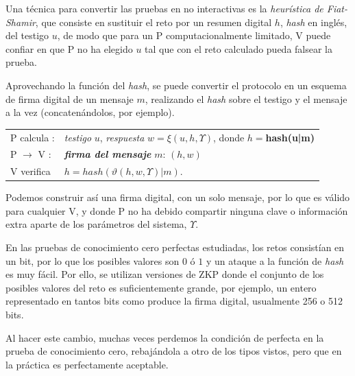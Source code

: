 Una técnica para convertir las pruebas en no interactivas es la \textit{heurística de Fiat-Shamir}, que consiste en sustituir el reto por un resumen digital $h$, \textit{hash} en inglés, del testigo $u$, de modo que para un P computacionalmente limitado, V puede confiar en que P no ha elegido $u$ tal que con el reto calculado pueda falsear la prueba.

Aprovechando la función del \textit{hash}, se puede convertir el protocolo en un esquema de firma digital de un mensaje $m$, realizando el \textit{hash} sobre el testigo y el mensaje a la vez (concatenándolos, por ejemplo).


\begin{center}
	\begin{tabular}{ll}\label{fiat-shamir-heur}
		P calcula :& \textit{testigo} $u$, \textit{respuesta} $w = \xi(u, h,\Upsilon)$, donde $h=$\textbf{hash(u|m)}
		\\
		P $\rightarrow$ V :& \textit{\textbf{firma del mensaje}} $m$: \quad $(h,w)$
		\\
		V verifica & $h=hash(\vartheta(h,w,\Upsilon)|m)$.
	\end{tabular}
\end{center}

Podemos construir así una firma digital, con un solo mensaje, por lo que es válido para cualquier V, y donde P no ha debido compartir ninguna clave o información extra aparte de los parámetros del sistema, $\Upsilon$.

\hfil


\begin{remark}
	\hfil
	
	En las pruebas de conocimiento cero perfectas estudiadas, los retos consistían en un bit, por lo que los posibles valores son $0$ ó $1$ y un ataque a la función de \textit{hash} es muy fácil. Por ello, se utilizan versiones de ZKP donde el conjunto de los posibles valores del reto es suficientemente grande, por ejemplo, un entero representado en tantos bits como produce la firma digital, usualmente 256 o 512 bits.
	
	Al hacer este cambio, muchas veces perdemos la condición de perfecta en la prueba de conocimiento cero, rebajándola a otro de los tipos vistos, pero que en la práctica es perfectamente aceptable.
	
\end{remark}








